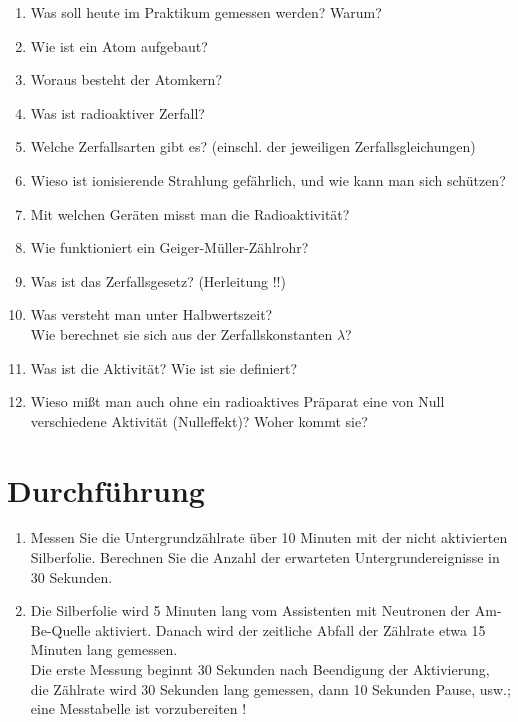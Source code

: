 \begin{enumerate}
	\item Was soll heute im Praktikum gemessen werden? Warum?
	\item Wie ist ein Atom aufgebaut?
	\item Woraus besteht der Atomkern?
	\item Was ist radioaktiver Zerfall?
	\item Welche Zerfallsarten gibt es? (einschl. der jeweiligen Zerfallsgleichungen)
	\item Wieso ist ionisierende Strahlung gefährlich, und wie kann man sich schützen?
	\item Mit welchen Geräten misst man die Radioaktivität?
	\item Wie funktioniert ein Geiger-Müller-Zählrohr?
	\item Was ist das Zerfallsgesetz? (Herleitung !!)
	\item Was versteht man unter Halbwertszeit? \\
		Wie berechnet sie sich aus der Zerfallskonstanten $\lambda$?
	\item Was ist die Aktivität? Wie ist sie definiert?
	\item Wieso mißt man auch ohne ein radioaktives Präparat eine von Null verschiedene Aktivität (Nulleffekt)? Woher kommt sie?
\end{enumerate}

\section{Durchführung} 

\begin{enumerate}
	\item Messen Sie die Untergrundzählrate über 10 Minuten mit der nicht aktivierten Silberfolie. Berechnen Sie die Anzahl der erwarteten Untergrundereignisse in 30 Sekunden.
	\item Die Silberfolie wird 5 Minuten lang vom Assistenten mit Neutronen der Am-Be-Quelle aktiviert. Danach wird der zeitliche Abfall der Zählrate etwa 15 Minuten lang gemessen.\\
	Die erste Messung beginnt 30 Sekunden nach Beendigung der Aktivierung, die Zählrate wird 30 Sekunden lang gemessen, dann 10 Sekunden Pause, usw.; eine Messtabelle ist vorzubereiten !
\end{enumerate}

